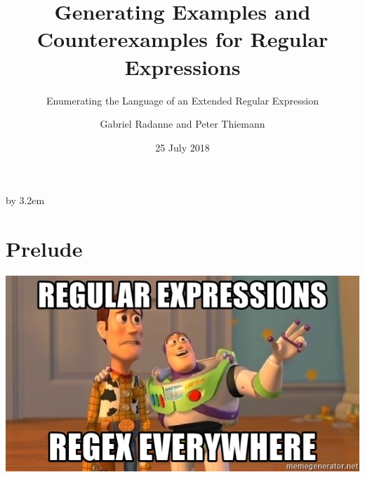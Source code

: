 \documentclass[pdftex,aspectratio=169]{beamer}
\begin{document}
\everymath{\displaystyle}


\title{Generating Examples and Counterexamples for Regular Expressions}
\subtitle{Enumerating the Language of an Extended Regular Expression}
\author[Thiemann]%
{Gabriel Radanne and Peter Thiemann}
\date[2018-07-25]{25 July 2018}

\makeatletter
\begin{frame}[plain,label=fp]
    \advance\textwidth by 3.2em\relax
    \begin{minipage}{\textwidth}\par%
      \maketitle
    \end{minipage}
    \hspace*{2.5em}%
\end{frame}
\makeatother 

\section{Prelude}

\begin{frame}
    \begin{center}
      \includegraphics[scale=0.8]{regular-expressions-regex-everywhere}
    \end{center}
\end{frame}
\end{document}
